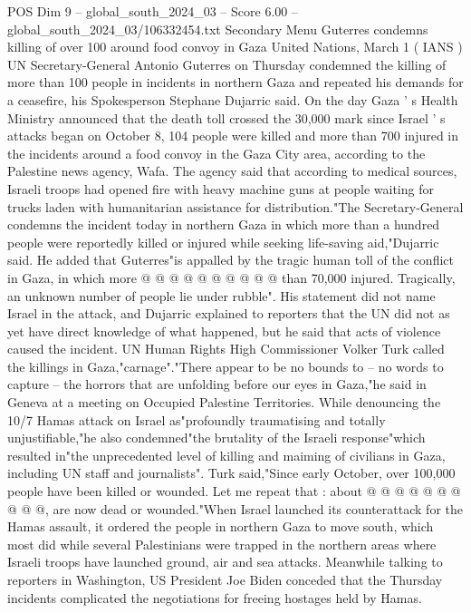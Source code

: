 \begin{textsample}{POS Dim 9 – global\_south\_2024\_03 – Score 6.00 – global\_south\_2024\_03/106332454.txt}  \label{ex:f9_pos_048}
Secondary Menu Guterres condemns killing of over 100 around food convoy in Gaza United Nations, March 1 ( IANS ) UN Secretary-General Antonio Guterres on Thursday condemned the killing of more than 100 people in incidents in northern Gaza and repeated his demands for a ceasefire, his Spokesperson Stephane Dujarric said.
On the day Gaza ' s Health Ministry announced that the death toll crossed the 30,000 mark since Israel ' s attacks began on October 8, 104 people were killed and more than 700 injured in the incidents around a food convoy in the Gaza City area, according to the Palestine news agency, Wafa.
The agency said that according to medical sources, Israeli troops had opened fire with heavy machine guns at people waiting for trucks laden with humanitarian assistance for distribution."The Secretary-General condemns the incident today in northern Gaza in which more than a hundred people were reportedly killed or injured while seeking life-saving aid,"Dujarric said.
He added that Guterres"is appalled by the tragic human toll of the conflict in Gaza, in which more @ @ @ @ @ @ @ @ @ @ than 70,000 injured.
Tragically, an unknown number of people lie under rubble".
His statement did not name Israel in the attack, and Dujarric explained to reporters that the UN did not as yet have direct knowledge of what happened, but he said that acts of violence caused the incident.
UN Human Rights High Commissioner Volker Turk called the killings in Gaza,"carnage"."There appear to be no bounds to -- no words to capture -- the horrors that are unfolding before our eyes in Gaza,"he said in Geneva at a meeting on Occupied Palestine Territories.
While denouncing the 10/7 Hamas attack on Israel as"profoundly traumatising and totally unjustifiable,"he also condemned"the brutality of the Israeli response"which resulted in"the unprecedented level of killing and maiming of civilians in Gaza, including UN staff and journalists".
Turk said,"Since early October, over 100,000 people have been killed or wounded.
Let me repeat that : about @ @ @ @ @ @ @ @ @ @, are now dead or wounded."When Israel launched its counterattack for the Hamas assault, it ordered the people in northern Gaza to move south, which most did while several Palestinians were trapped in the northern areas where Israeli troops have launched ground, air and sea attacks.
Meanwhile talking to reporters in Washington, US President Joe Biden conceded that the Thursday incidents complicated the negotiations for freeing hostages held by Hamas.

\end{textsample}
